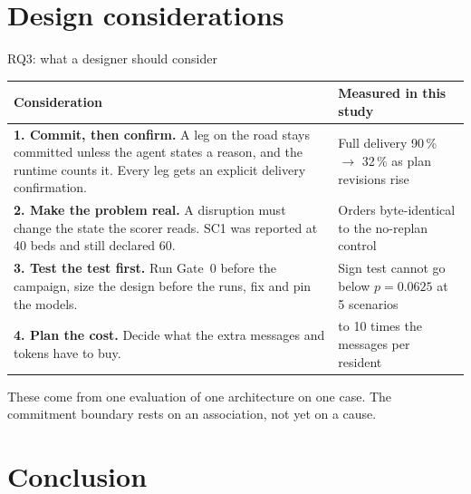 \documentclass[10pt,aspectratio=169]{beamer}
\begin{document}
\section{Design considerations}

\begin{frame}{RQ3: what a designer should consider}
  \small
  \begin{tabularx}{\textwidth}{@{}>{\raggedright\arraybackslash}X>{\raggedright\arraybackslash}p{3.9cm}@{}}
    \toprule
    Consideration & Measured in this study \\
    \midrule
    \textbf{1. Commit, then confirm.} A leg on the road stays committed
      unless the agent states a reason, and the runtime counts it. Every leg
      gets an explicit delivery confirmation.
      & Full delivery 90\,\% $\to$ 32\,\% as plan revisions rise \\
    \addlinespace
    \textbf{2. Make the problem real.} A disruption must change the state
      the scorer reads. SC1 was reported at 40 beds and still declared 60.
      & Orders byte-identical to the no-replan control \\
    \addlinespace
    \textbf{3. Test the test first.} Run Gate~0 before the campaign, size
      the design before the runs, fix and pin the models.
      & Sign test cannot go below $p = 0.0625$ at 5 scenarios \\
    \addlinespace
    \textbf{4. Plan the cost.} Decide what the extra messages and tokens
      have to buy.
      & 9 to 10 times the messages per resident \\
    \bottomrule
  \end{tabularx}

  \medskip
  These come from one evaluation of one architecture on one case. The
  commitment boundary rests on an association, not yet on a cause.
\end{frame}

\section{Conclusion}
\end{document}
